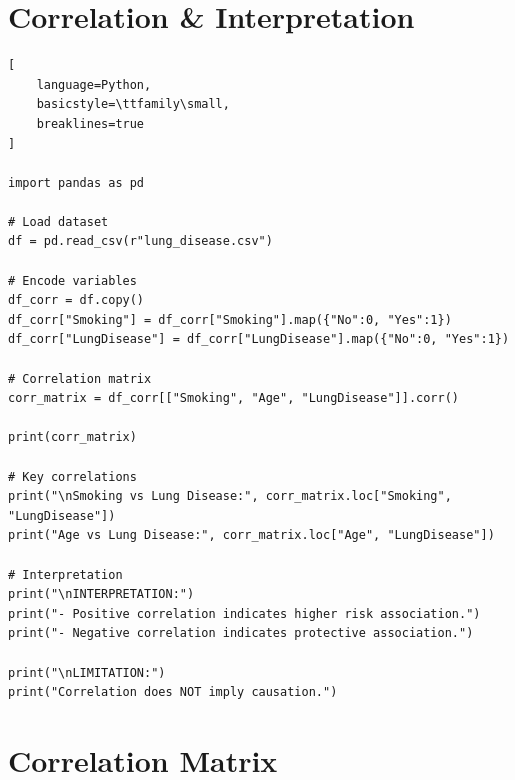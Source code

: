 \documentclass[12pt,a4paper]{report}
\begin{document}
\section*{Correlation \& Interpretation}

\begin{center}
\end{center}
\begin{tcolorbox}[
    enhanced,
    colback=blue!3,
    colframe=blue!70!black,
    title=Correlation Analysis (Smoking, Age, Lung Disease),
    fonttitle=\bfseries,
    coltitle=white,
    colbacktitle=blue!70!black,
    arc=4pt,
    boxrule=1pt,
    breakable
]

\begin{lstlisting}[
    language=Python,
    basicstyle=\ttfamily\small,
    breaklines=true
]

import pandas as pd

# Load dataset
df = pd.read_csv(r"lung_disease.csv")

# Encode variables
df_corr = df.copy()
df_corr["Smoking"] = df_corr["Smoking"].map({"No":0, "Yes":1})
df_corr["LungDisease"] = df_corr["LungDisease"].map({"No":0, "Yes":1})

# Correlation matrix
corr_matrix = df_corr[["Smoking", "Age", "LungDisease"]].corr()

print(corr_matrix)

# Key correlations
print("\nSmoking vs Lung Disease:", corr_matrix.loc["Smoking", "LungDisease"])
print("Age vs Lung Disease:", corr_matrix.loc["Age", "LungDisease"])

# Interpretation
print("\nINTERPRETATION:")
print("- Positive correlation indicates higher risk association.")
print("- Negative correlation indicates protective association.")

print("\nLIMITATION:")
print("Correlation does NOT imply causation.")

\end{lstlisting}

\end{tcolorbox}
\section*{Correlation Matrix}
\end{document}
